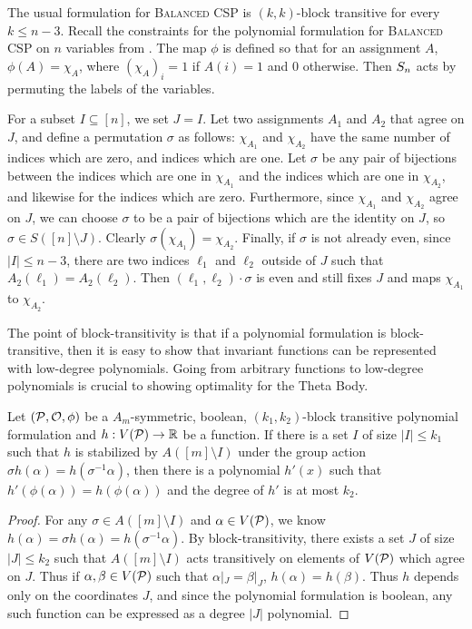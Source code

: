 \begin{example}\label{ex:bcsp-blocktransitive}
The usual formulation for \textsc{Balanced CSP} is $(k,k)$-block transitive for every $k \leq n-3$. Recall the constraints for the polynomial formulation for \textsc{Balanced CSP} on $n$ variables from . The map $\phi$ is defined so that for an assignment $A$, $\phi(A) = \chi_A$, where $(\chi_A)_i = 1$ if $A(i) = 1$ and $0$ otherwise. Then $S_{n}$ acts by permuting the labels of the variables.

For a subset $I \subseteq [n]$, we set $J = I$. Let two assignments $A_1$ and $A_2$ that agree on $J$, and define a permutation $\sigma$ as follows: $\chi_{A_1}$ and $\chi_{A_2}$ have the same number of indices which are zero, and indices which are one. Let $\sigma$ be any pair of bijections between the indices which are one in $\chi_{A_1}$ and the indices which are one in $\chi_{A_2}$, and likewise for the indices which are zero. Furthermore, since $\chi_{A_1}$ and $\chi_{A_2}$ agree on $J$, we can choose $\sigma$ to be a pair of bijections which are the identity on $J$, so $\sigma \in S([n] \setminus J)$. Clearly $\sigma(\chi_{A_1}) = \chi_{A_2}$. Finally, if $\sigma$ is not already even, since $|I| \leq n-3$, there are two indices $\ell_1$ and $\ell_2$ outside of $J$ such that $A_2(\ell_1) = A_2(\ell_2)$. Then $(\ell_1, \ell_2) \cdot \sigma$ is even and still fixes $J$ and maps $\chi_{A_1}$ to $\chi_{A_2}$.
\end{example}

The point of block-transitivity is that if a polynomial formulation is block-transitive, then it is easy to show that invariant functions can be represented with low-degree polynomials. Going from arbitrary functions to low-degree polynomials is crucial to showing optimality for the Theta Body.  
\begin{lemma}\label{lem:functopoly}
Let $(\mathcal P, \mathcal O, \phi)$ be a $A_m$-symmetric, boolean, $(k_1,k_2)$-block transitive polynomial formulation and $h: V(\mathcal P) \rightarrow \mathbb R$ be a function. If there is a set $I$ of size $|I| \leq k_1$ such that $h$ is stabilized by $A([m] \setminus I)$ under the group action $\sigma h(\alpha) = h(\sigma^{-1} \alpha)$, then there is a polynomial $h'(x)$ such that $h'(\phi(\alpha)) = h(\phi(\alpha))$ and the degree of $h'$ is at most $k_2$. 
\end{lemma}
\begin{proof}
For any $\sigma \in A([m] \setminus I)$ and $\alpha \in V(\mathcal P)$, we know $h(\alpha) = \sigma h(\alpha) = h(\sigma^{-1} \alpha)$. By block-transitivity, there exists a set $J$ of size $|J| \leq k_2$ such that $A([m]\setminus I)$ acts transitively on elements of $V(\mathcal P)$ which agree on $J$. Thus if $\alpha,\beta \in V(\mathcal P)$ such that $\alpha|_J = \beta|_J$, $h(\alpha) = h(\beta)$. Thus $h$ depends only on the coordinates $J$, and since the polynomial formulation is boolean, any such function can be expressed as a degree $|J|$ polynomial. 
\end{proof} 

